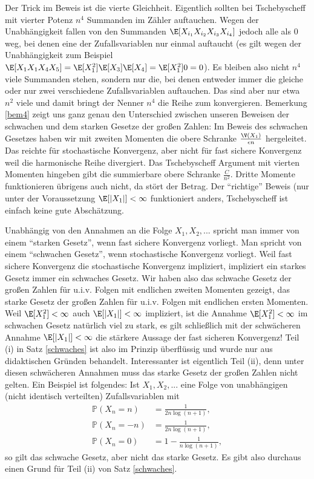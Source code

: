Der Trick im Beweis ist die vierte Gleichheit. Eigentlich sollten bei Tschebyscheff mit vierter Potenz $n^4$ Summanden im Z\"ahler auftauchen. Wegen der Unabh\"angigkeit fallen von den Summanden $\E[X_{i_1}  X_{i_2}  X_{i_3}  X_{i_4}]$ jedoch alle als $0$ weg, bei denen eine der Zufallsvariablen nur einmal auftaucht (es gilt wegen der Unabh\"angigkeit zum Beispiel $\E[X_1 X_1 X_4X_5]=\E[X_1^2] \E[X_3]\E[X_4]=\E[X_1^2] 0=0$). Es bleiben also nicht $n^4$ viele Summanden stehen, sondern nur die, bei denen entweder immer die gleiche oder nur zwei verschiedene Zufallsvariablen auftauchen. Das sind aber nur etwa $n^2$ viele und damit bringt der Nenner $n^4$ die Reihe zum konvergieren. Bemerkung \ref{bem4} zeigt uns ganz genau den Unterschied zwischen unseren Beweisen der schwachen und dem starken Gesetze der gro\ss en Zahlen: Im Beweis des schwachen Gesetzes haben wir mit zweiten Momenten die obere Schranke $\frac{\V(X_1)}{\epsilon n}$ hergeleitet. Das reichte f\"ur stochastische Konvergenz, aber nicht f\"ur fast sichere Konvergenz weil die harmonische Reihe divergiert. Das Tschebyscheff Argument mit vierten Momenten hingeben gibt die summierbare obere Schranke $\frac{C}{n^2}$.  Dritte Momente funktionieren \"ubrigens auch nicht, da st\"ort der Betrag. Der \enquote{richtige} Beweis (nur unter der Voraussetzung $\E[|X_1|]<\infty$ funktioniert anders, Tschebyscheff ist einfach keine gute Absch\"atzung.
\begin{bem}
Unabh\"angig von den Annahmen an die Folge $X_1, X_2, ...$ spricht man immer von einem \enquote{starken Gesetz}, wenn fast sichere Konvergenz vorliegt. Man spricht von einem \enquote{schwachen Gesetz}, wenn stochastische Konvergenz vorliegt. Weil fast sichere Konvergenz die stochastische Konvergenz impliziert, impliziert ein starkes Gesetz immer ein schwaches Gesetz. Wir haben also das schwache Gesetz der gro\ss en Zahlen f\"ur u.i.v. Folgen mit endlichen zweiten Momenten gezeigt, das starke Gesetz der gro\ss en Zahlen f\"ur u.i.v. Folgen mit endlichen ersten Momenten. Weil $\E[X_1^2]<\infty$ auch $\E[|X_1|]<\infty$ impliziert, ist die Annahme $\E[X_1^2]<\infty$ im schwachen Gesetz nat\"urlich viel zu stark, es gilt schlie\ss lich mit der schw\"acheren Annahme $\E[|X_1|]<\infty$ die st\"arkere Aussage der fast sicheren Konvergenz! Teil (i) in Satz \ref{schwaches} ist also im Prinzip \"uberfl\"ussig und wurde nur aus didaktischen Gr\"unden behandelt. Interessanter ist eigentlich Teil (ii), denn unter diesen schw\"acheren Annahmen muss das starke Gesetz der gro\ss en Zahlen nicht gelten. Ein Beispiel ist folgendes: Ist $X_1, X_2, ...$ eine Folge von unabh\"angigen (nicht identisch verteilten) Zufallsvariablen mit 
\begin{align*}
	\mathbb P(X_n=n)&=\frac{1}{2 n \log(n+1)},\\
	\mathbb P(X_n=-n)&=\frac{1}{2 n \log(n+1)},\\
	\mathbb P(X_n=0)&=1-\frac{1}{ n \log(n+1)},
\end{align*}
so gilt das schwache Gesetz, aber nicht das starke Gesetz. Es gibt also durchaus einen Grund f\"ur Teil (ii) von Satz \ref{schwaches}.
\end{bem}

